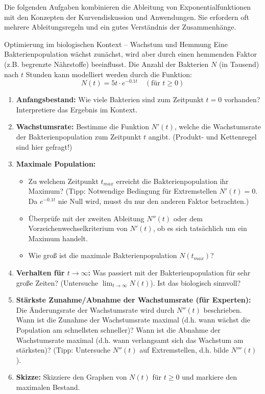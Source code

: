 Die folgenden Aufgaben kombinieren die Ableitung von Exponentialfunktionen mit den Konzepten der Kurvendiskussion und Anwendungen. Sie erfordern oft mehrere Ableitungsregeln und ein gutes Verständnis der Zusammenhänge.

\begin{aufgabenumgebung}{Optimierung im biologischen Kontext – Wachstum und Hemmung}
Eine Bakterienpopulation wächst zunächst, wird aber durch einen hemmenden Faktor (z.B. begrenzte Nährstoffe) beeinflusst. Die Anzahl der Bakterien $N$ (in Tausend) nach $t$ Stunden kann modelliert werden durch die Funktion:
\[ N(t) = 5t \cdot e^{-0.1t} \quad (\text{für } t \ge 0) \]
\begin{enumerate}
    \item \textbf{Anfangsbestand:} Wie viele Bakterien sind zum Zeitpunkt $t=0$ vorhanden? Interpretiere das Ergebnis im Kontext.
    \item \textbf{Wachstumsrate:} Bestimme die Funktion $N'(t)$, welche die Wachstumsrate der Bakterienpopulation zum Zeitpunkt $t$ angibt. (Produkt- und Kettenregel sind hier gefragt!)
    \item \textbf{Maximale Population:}
        \begin{itemize}
            \item Zu welchem Zeitpunkt $t_{max}$ erreicht die Bakterienpopulation ihr Maximum? (Tipp: Notwendige Bedingung für Extremstellen $N'(t)=0$. Da $e^{-0.1t}$ nie Null wird, musst du nur den anderen Faktor betrachten.)
            \item Überprüfe mit der zweiten Ableitung $N''(t)$ oder dem Vorzeichenwechselkriterium von $N'(t)$, ob es sich tatsächlich um ein Maximum handelt.
            \item Wie groß ist die maximale Bakterienpopulation $N(t_{max})$?
        \end{itemize}
    \item \textbf{Verhalten für $t \to \infty$:} Was passiert mit der Bakterienpopulation für sehr große Zeiten? (Untersuche $\lim_{t \to \infty} N(t)$). Ist das biologisch sinnvoll?
    \item \textbf{Stärkste Zunahme/Abnahme der Wachstumsrate (für Experten):}
        Die Änderungsrate der Wachstumsrate wird durch $N''(t)$ beschrieben. Wann ist die Zunahme der Wachstumsrate maximal (d.h. wann wächst die Population am schnellsten schneller)? Wann ist die Abnahme der Wachstumsrate maximal (d.h. wann verlangsamt sich das Wachstum am stärksten)? (Tipp: Untersuche $N''(t)$ auf Extremstellen, d.h. bilde $N'''(t)$).
    \item \textbf{Skizze:} Skizziere den Graphen von $N(t)$ für $t \ge 0$ und markiere den maximalen Bestand.
\end{enumerate}
\end{aufgabenumgebung}

